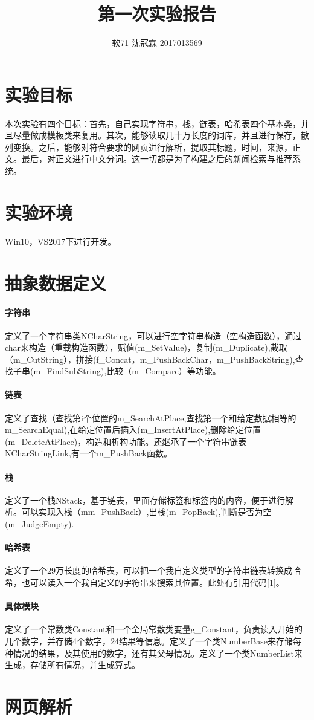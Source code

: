 \documentclass{article}
\title{第一次实验报告}
\author{软71 沈冠霖 2017013569}
\begin{document}
\begin{CJK}{UTF8}{gbsn}
\maketitle
\section{实验目标}本次实验有四个目标：首先，自己实现字符串，栈，链表，哈希表四个基本类，并且尽量做成模板类来复用。其次，能够读取几十万长度的词库，并且进行保存，散列变换。之后，能够对符合要求的网页进行解析，提取其标题，时间，来源，正文。最后，对正文进行中文分词。这一切都是为了构建之后的新闻检索与推荐系统。
\section{实验环境} Win10，VS2017下进行开发。

\section{抽象数据定义}
\paragraph{字符串}定义了一个字符串类NCharString，可以进行空字符串构造（空构造函数），通过char来构造（重载构造函数），赋值(m_SetValue)，复制(m_Duplicate),截取（m_CutString），拼接(f_Concat，m_PushBackChar，m_PushBackString),查找子串(m_FindSubString),比较（m_Compare）等功能。
\paragraph{链表}定义了查找（查找第i个位置的m_SearchAtPlace,查找第一个和给定数据相等的m_SearchEqual),在给定位置后插入(m_InsertAtPlace),删除给定位置(m_DeleteAtPlace)，构造和析构功能。还继承了一个字符串链表NCharStringLink,有一个m_PushBack函数。
\paragraph{栈}定义了一个栈NStack，基于链表，里面存储标签和标签内的内容，便于进行解析。可以实现入栈（mm_PushBack）,出栈(m_PopBack),判断是否为空(m_JudgeEmpty).
\paragraph{哈希表}定义了一个29万长度的哈希表，可以把一个我自定义类型的字符串链表转换成哈希，也可以读入一个我自定义的字符串来搜索其位置。此处有引用代码[1]。
\paragraph{具体模块}定义了一个常数类Constant和一个全局常数类变量g\_Constant，负责读入开始的几个数字，并存储4个数字，24结果等信息。定义了一个类NumberBase来存储每种情况的结果，及其使用的数字，还有其父母情况。定义了一个类NumberList来生成，存储所有情况，并生成算式。
\section{网页解析}

\end{CJK}
\end{document}
